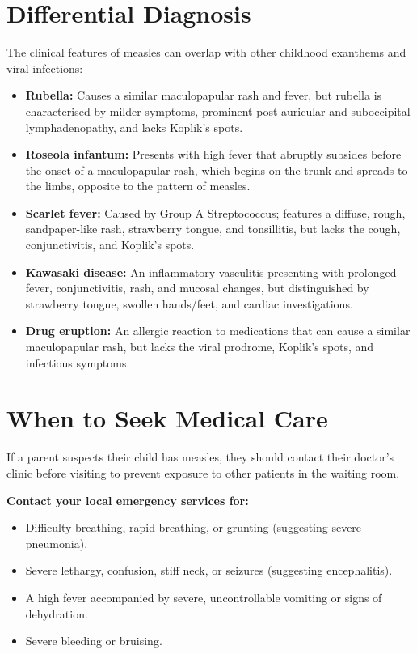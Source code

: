 \section*{Differential Diagnosis}
The clinical features of measles can overlap with other childhood exanthems and viral infections:
\begin{itemize}
    \item \textbf{Rubella:} Causes a similar maculopapular rash and fever, but rubella is characterised by milder symptoms, prominent post-auricular and suboccipital lymphadenopathy, and lacks Koplik's spots.
    \item \textbf{Roseola infantum:} Presents with high fever that abruptly subsides before the onset of a maculopapular rash, which begins on the trunk and spreads to the limbs, opposite to the pattern of measles.
    \item \textbf{Scarlet fever:} Caused by Group A Streptococcus; features a diffuse, rough, sandpaper-like rash, strawberry tongue, and tonsillitis, but lacks the cough, conjunctivitis, and Koplik's spots.
    \item \textbf{Kawasaki disease:} An inflammatory vasculitis presenting with prolonged fever, conjunctivitis, rash, and mucosal changes, but distinguished by strawberry tongue, swollen hands/feet, and cardiac investigations.
    \item \textbf{Drug eruption:} An allergic reaction to medications that can cause a similar maculopapular rash, but lacks the viral prodrome, Koplik's spots, and infectious symptoms.
\end{itemize}

\section*{When to Seek Medical Care}
If a parent suspects their child has measles, they should contact their doctor's clinic before visiting to prevent exposure to other patients in the waiting room.

\textbf{Contact your local emergency services for:}
\begin{itemize}
    \item Difficulty breathing, rapid breathing, or grunting (suggesting severe pneumonia).
    \item Severe lethargy, confusion, stiff neck, or seizures (suggesting encephalitis).
    \item A high fever accompanied by severe, uncontrollable vomiting or signs of dehydration.
    \item Severe bleeding or bruising.
\end{itemize}

